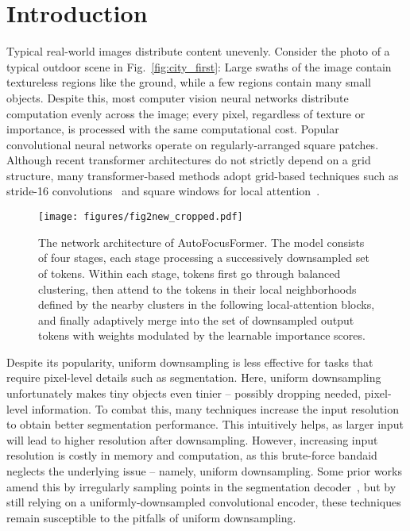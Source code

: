 \documentclass[10pt,twocolumn,letterpaper]{article}
\begin{document}
\section{Introduction}
\label{sec:intro}



Typical real-world images distribute content unevenly. Consider the photo of a typical outdoor scene in Fig.~\ref{fig:city_first}: Large swaths of the image contain textureless regions like the ground, while a few regions contain many small objects. Despite this, most computer vision neural networks distribute computation evenly across the image; every pixel, regardless of texture or importance, is processed with the same computational cost. Popular convolutional neural networks operate on regularly-arranged square patches. Although recent transformer architectures do not strictly depend on a grid structure, many transformer-based methods adopt grid-based techniques such as stride-16 convolutions~\cite{vit} and  square windows for local attention~\cite{swin}.

\begin{figure*}[t]
    \centering
    \texttt{[image: figures/fig2new\_cropped.pdf]}
    \vskip -0.1in
    \caption{The network architecture of AutoFocusFormer. The model consists of four stages, each stage processing a successively downsampled set of tokens. Within each stage, tokens first go through balanced clustering, then attend to the tokens in their local neighborhoods defined by the nearby clusters in the following local-attention blocks, and finally adaptively merge into the set of downsampled output tokens with weights modulated by the learnable importance scores.}
    \label{fig:flowchart}
    \vskip -0.15in
\end{figure*}

Despite its popularity, uniform downsampling is less effective for tasks that require pixel-level details such as segmentation. Here, uniform downsampling unfortunately makes tiny objects even tinier -- possibly dropping needed, pixel-level information. To combat this, many techniques increase the input resolution~\cite{sniper, du2021simple} to obtain better segmentation performance. This intuitively helps, as larger input will lead to higher resolution after downsampling. However, increasing input resolution is costly in memory and computation, as this brute-force bandaid neglects the underlying issue -- namely, uniform downsampling. Some prior works amend this by irregularly sampling points in the segmentation decoder~\cite{kirillov2020pointrend}, but by still relying on a uniformly-downsampled convolutional encoder, these techniques remain susceptible to the pitfalls of uniform downsampling.
\end{document}
